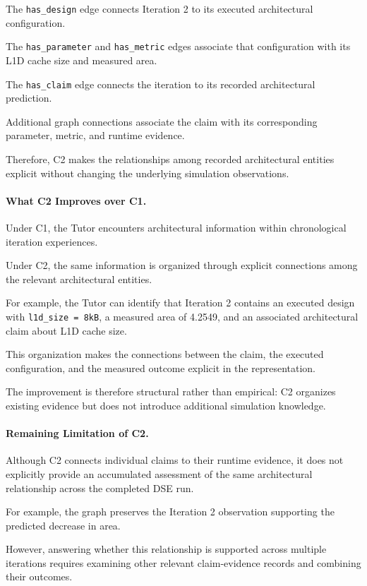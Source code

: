 The \texttt{has\_design} edge
connects Iteration 2 to its
executed architectural configuration.

The \texttt{has\_parameter}
and \texttt{has\_metric}
edges associate that configuration
with its L1D cache size
and measured area.

The \texttt{has\_claim} edge
connects the iteration to
its recorded architectural
prediction.

Additional graph connections
associate the claim with
its corresponding parameter,
metric, and runtime evidence.

Therefore, C2 makes the
relationships among recorded
architectural entities explicit
without changing the underlying
simulation observations.

\paragraph{What C2 Improves over C1.}

Under C1, the Tutor encounters
architectural information within
chronological iteration experiences.

Under C2, the same information
is organized through explicit
connections among the relevant
architectural entities.

For example, the Tutor can
identify that Iteration 2
contains an executed design
with \texttt{l1d\_size = 8kB},
a measured area of 4.2549,
and an associated architectural
claim about L1D cache size.

This organization makes the
connections between the claim,
the executed configuration,
and the measured outcome
explicit in the representation.

The improvement is therefore
structural rather than empirical:
C2 organizes existing evidence
but does not introduce
additional simulation knowledge.

\paragraph{Remaining Limitation of C2.}

Although C2 connects individual
claims to their runtime evidence,
it does not explicitly provide
an accumulated assessment of
the same architectural relationship
across the completed DSE run.

For example, the graph preserves
the Iteration 2 observation
supporting the predicted decrease
in area.

However, answering whether this
relationship is supported
across multiple iterations
requires examining other
relevant claim-evidence records
and combining their outcomes.

